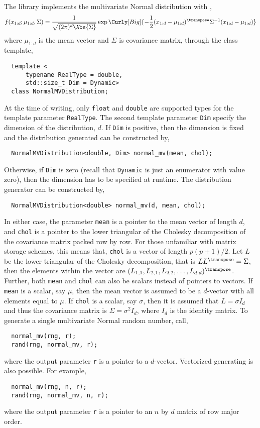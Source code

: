 The library implements the multivariate Normal distribution with \pdf,
\begin{equation*}
  f(x_{1:d};\mu_{1:d},\Sigma) = \frac{1}{\sqrt{(2\pi)^d\Abs{\Sigma}}}
  \exp\Curly[Big]{-\frac{1}{2}
    (x_{1:d} - \mu_{1:d})^{\transpose}\Sigma^{-1}(x_{1:d} - \mu_{1:d})}
\end{equation*}
where $\mu_{1:d}$ is the mean vector and $\Sigma$ is covariance matrix, through
the class template,
\begin{Verbatim}
  template <
      typename RealType = double,
      std::size_t Dim = Dynamic>
  class NormalMVDistribution;
\end{Verbatim}
At the time of writing, only \verb|float| and \verb|double| are supported types
for the template parameter \verb|RealType|. The second template parameter
\verb|Dim| specify the dimension of the distribution, $d$. If \verb|Dim| is
positive, then the dimension is fixed and the distribution generated can be
constructed by,
\begin{Verbatim}
  NormalMVDistribution<double, Dim> normal_mv(mean, chol);
\end{Verbatim}
Otherwise, if \verb|Dim| is zero (recall that \verb|Dynamic| is just an
enumerator with value zero), then the dimension has to be specified at runtime.
The distribution generator can be constructed by,
\begin{Verbatim}
  NormalMVDistribution<double> normal_mv(d, mean, chol);
\end{Verbatim}
In either case, the parameter \verb|mean| is a pointer to the mean vector of
length $d$, and \verb|chol| is a pointer to the lower triangular of the
Cholesky decomposition of the covariance matrix packed row by row. For those
unfamiliar with matrix storage schemes, this means that, \verb|chol| is a
vector of length $p(p+1)/2$. Let $L$ be the lower triangular of the Cholesky
decomposition, that is $LL^{\transpose} = \Sigma$, then the elements within the
vector are $(L_{1,1},L_{2,1},L_{2,2},\dots,L_{d,d})^{\transpose}$. Further,
both \verb|mean| and \verb|chol| can also be scalars instead of pointers to
vectors. If \verb|mean| is a scalar, say $\mu$, then the mean vector is assumed
to be a $d$-vector with all elements equal to $\mu$. If \verb|chol| is a
scalar, say $\sigma$, then it is assumed that $L = \sigma I_d$ and thus the
covariance matrix is $\Sigma = \sigma^2 I_d$, where $I_d$ is the identity
matrix. To generate a single multivariate Normal random number, call,
\begin{Verbatim}
  normal_mv(rng, r);
  rand(rng, normal_mv, r);
\end{Verbatim}
where the output parameter \verb|r| is a pointer to a $d$-vector. Vectorized
generating is also possible. For example,
\begin{Verbatim}
  normal_mv(rng, n, r);
  rand(rng, normal_mv, n, r);
\end{Verbatim}
where the output parameter \verb|r| is a pointer to an $n$ by $d$ matrix of row
major order.
